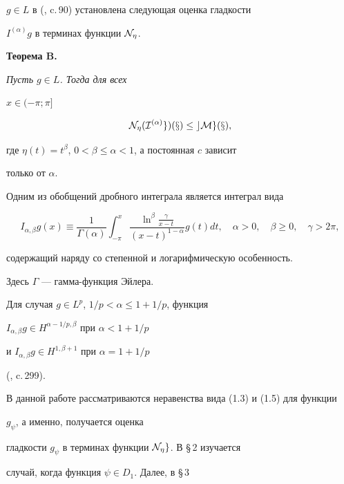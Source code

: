 $g\in L$ в  (\cite{kor}, c.\,90) установлена следующая оценка гладкости


$I^{(\alpha)}g$ в терминах функции $\cal N_\eta$.


\medskip





{\bf Теорема B.} {\it Пусть $g\in L$. Тогда для всех


$x\in (-\pi;\pi]$


\begin{equation}


\N_\eta(I^{(\alpha)}g)(x)\le cMg(x), 


\end{equation}


где $\eta(t)=t^\beta$, $0<\beta\le\alpha<1$, а постоянная $c$ зависит


только от $\alpha$.}


\medskip





Одним из обобщений дробного интеграла является интеграл вида


$$


I_{\alpha,\beta}g(x)\equiv\frac{1}{\Gamma(\alpha)}\int_{-\pi}^x


\frac{\ln^\beta\frac{\gamma}{x-t}}{(x-t)^{1-\alpha}}g(t)dt, \quad


\alpha>0, \quad \beta\ge 0, \quad \gamma>2\pi,


$$


содержащий наряду со степенной и логарифмическую особенность.


Здесь $\Gamma$ --- гамма-функция Эйлера.


Для случая $g\in L^p$, $1/p<\alpha\le 1+1/p$, функция


$I_{\alpha,\beta}g\in H^{\alpha-1/p,\beta}$ при $\alpha<1+1/p$


и $I_{\alpha,\beta}g\in H^{1,\beta+1}$ при $\alpha=1+1/p$


(\cite{sam}, c.\,299).





В данной работе рассматриваются неравенства вида (1.3) и (1.5) для функции


$g_\psi$, а именно, получается оценка


гладкости $g_\psi$ в терминах функции $\cal N_\eta g$. В \S\,2 изучается


случай, когда функция $\psi\in D_1$. Далее, в \S\,3


